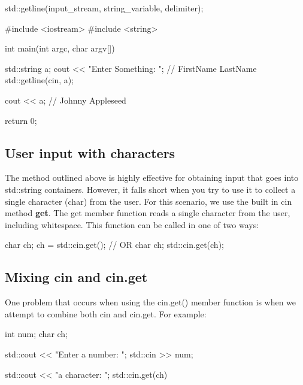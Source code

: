 \documentclass{report}
\begin{document}
    \begin{cppcode}
                    std::getline(input_stream, string_variable, delimiter);
    \end{cppcode}
    \bigbreak \noindent 
    
    \bigbreak \noindent 
    
    \begin{cppcode}
#include <iostream>
#include <string>

int main(int argc, char argv[]){

    std::string a;
    cout << "Enter Something: "; // FirstName LastName
    std::getline(cin, a);

    cout << a; // Johnny Appleseed

    return 0;
}
    \end{cppcode}
    

    \pagebreak
    \subsection{User input with characters}
    \bigbreak \noindent 
    The method outlined above is highly effective for obtaining input that goes into std::string containers. However, it falls short when you try to use it to collect a single character (char) from the user. 
    \bigbreak \noindent 
    For this scenario, we use the built in cin method \textbf{get}. The get member function reads a single character from the user, including whitespace. 
    \bigbreak \noindent 
    This function can be called in one of two ways:
    \smallbreak \noindent
    
    \begin{cppcode}
char ch;
ch = std::cin.get();
// OR 
char ch;
std::cin.get(ch);
    \end{cppcode}
    

    \bigbreak \noindent 
    \subsection{Mixing cin and cin.get}
    \bigbreak \noindent 
    One problem that occurs when using the cin.get() member function is when we attempt to combine both cin and cin.get. For example:
    \smallbreak \noindent
    
    \begin{cppcode}
int num;
char ch;

std::cout << "Enter a number: ";
std::cin >> num;

std::cout << "\nEnter a character: ";
std::cin.get(ch)
    \end{cppcode}
    
\end{document}
